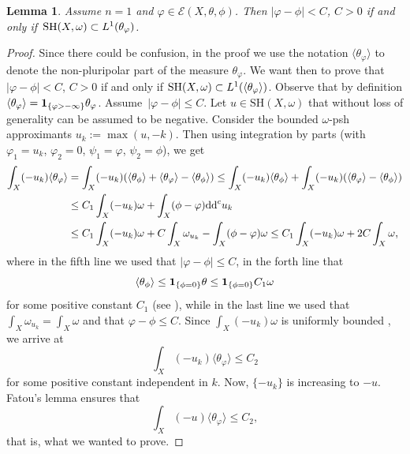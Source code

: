 \documentclass[pdftex]{sigma}
\numberwithin{equation}{section}
\newtheorem{Lemma}[Theorem]{Lemma}
\theoremstyle{plain}
\newcommand \SH {{\rm SH}}
\begin{document}
\begin{Lemma}
Assume $n =1$ and $\varphi\in \mathcal{E}(X, \theta, \phi)$. Then $|\varphi-\phi|< C$, $C>0$ if and only if~${\SH(X, \omega)\subset L^1(\theta_\varphi)}$.
\end{Lemma}
\begin{proof}
Since there could be confusion, in the proof we use the notation $\langle \theta_\varphi\rangle$ to denote the non-pluripolar part of the measure $\theta_\varphi$. We want then to prove that $|\varphi-\phi|< C$, $C>0$ if and only if $\SH(X, \omega)\subset L^1(\langle \theta_\varphi\rangle)$. Observe that by definition $\langle \theta_\varphi\rangle = {\bf 1}_{\{\varphi>-\infty\}} \theta_\varphi$. Assume~${|\varphi-\phi|\leq C}$. Let $u\in \text{SH}(X, \omega) $ that without loss of generality can be assumed to be negative. Consider the bounded $\omega$-psh approximants $u_k:=\max(u, -k)$. Then using integration by parts \cite[Lemma~4.7]{DDL6} (with $\varphi_1=u_k$, $\varphi_2=0$, $\psi_1=\varphi$, $\psi_2=\phi$), we get
\begin{align*}
\int_X (-u_k) \langle \theta_{\varphi} \rangle
&= \int_{X} (-u_k) (\langle\theta_{\phi}\rangle + \langle\theta_{\varphi}\rangle -\langle\theta_{\phi}\rangle)\leq \int_{X} (-u_k) \langle \theta_\phi \rangle + \int_{X} (-u_k) (\langle\theta_{\varphi}\rangle -\langle\theta_{\phi}\rangle)\\
&\leq C_1 \int_X (-u_k) \omega +\int_X (\phi-\varphi) {\rm dd}^c u_k\\
&\leq C_1 \int_X (-u_k) \omega + C \int_X\omega_{u_k} - \int_X (\phi-\varphi)\omega\leq C_1 \int_X (-u_k) \omega + 2C \int_X\omega,
 \end{align*}
 where in the fifth line we used that $|\varphi-\phi|\leq C$, in the forth line that
\[\langle \theta_\phi \rangle\leq {\bf 1}_{\{\phi=0\}} \theta\leq {\bf 1}_{\{\phi=0\}} C_1 \omega\]
for some positive constant $C_1 $ (see \cite[Theorem 3.6]{DDL6}), while in the last line we used that ${\int_X \omega_{u_k} = \int_X \omega}$ and that $\varphi-\phi \leq C$. Since $\int_X (-u_k) \omega $ is uniformly bounded \cite[Proposition~1.7]{GZ05}, we arrive at
\[\int_X (-u_k) \langle \theta_{\varphi} \rangle \leq C_2\]
for some positive constant independent in $k$. Now, $\{-u_k\}$ is increasing to $-u$. Fatou's lemma ensures that
\[\int_X (-u) \langle \theta_{\varphi} \rangle \leq C_2,\]
that is, what we wanted to prove.


\end{proof}
\end{document}
